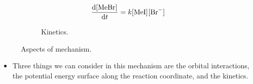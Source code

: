 \documentclass[../notes.tex]{subfiles}
\begin{document}
\begin{itemize}
\begin{figure}[H]
\begin{subfigure}[b]{0.3\linewidth}
        \end{subfigure}
        \begin{subfigure}[b]{0.3\linewidth}
            \centering
            \begin{equation*}
                \dv{\cnc{MeBr}}{t} = k\cnc{MeI}\cnc{Br-}
            \end{equation*}
            \caption{Kinetics.}
            \label{fig:mechAspectsc}
        \end{subfigure}
        \caption{Aspects of mechanism.}
        \label{fig:mechAspects}
    \end{figure}
    \begin{itemize}
        \item Three things we can consider in this mechanism are the orbital interactions, the potential energy surface along the reaction coordinate, and the kinetics.
    \end{itemize}
\end{itemize}
\end{document}

